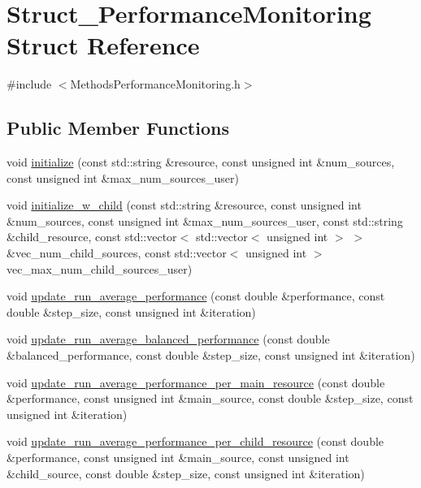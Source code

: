 \hypertarget{structStruct__PerformanceMonitoring}{\section{Struct\-\_\-\-Performance\-Monitoring Struct Reference}
\label{structStruct__PerformanceMonitoring}
}


{\ttfamily \#include $<$Methods\-Performance\-Monitoring.\-h$>$}

\subsection*{Public Member Functions}
\begin{DoxyCompactItemize}
\item 
void \hyperlink{structStruct__PerformanceMonitoring_a97d5962047f0577a68ddd420b1da8a1e}{initialize} (const std\-::string \&resource, const unsigned int \&num\-\_\-sources, const unsigned int \&max\-\_\-num\-\_\-sources\-\_\-user)
\item 
void \hyperlink{structStruct__PerformanceMonitoring_aa7963e7c54d30095a7283bbf49f4a61b}{initialize\-\_\-w\-\_\-child} (const std\-::string \&resource, const unsigned int \&num\-\_\-sources, const unsigned int \&max\-\_\-num\-\_\-sources\-\_\-user, const std\-::string \&child\-\_\-resource, const std\-::vector$<$ std\-::vector$<$ unsigned int $>$ $>$ \&vec\-\_\-num\-\_\-child\-\_\-sources, const std\-::vector$<$ unsigned int $>$ vec\-\_\-max\-\_\-num\-\_\-child\-\_\-sources\-\_\-user)
\item 
void \hyperlink{structStruct__PerformanceMonitoring_adcdd8d9911b6ef408cfe6680ab1fda43}{update\-\_\-run\-\_\-average\-\_\-performance} (const double \&performance, const double \&step\-\_\-size, const unsigned int \&iteration)
\item 
void \hyperlink{structStruct__PerformanceMonitoring_a73b2ca8763d02a85aa900c17c2187d18}{update\-\_\-run\-\_\-average\-\_\-balanced\-\_\-performance} (const double \&balanced\-\_\-performance, const double \&step\-\_\-size, const unsigned int \&iteration)
\item 
void \hyperlink{structStruct__PerformanceMonitoring_a19680cdaf279198b2065f97045aa7861}{update\-\_\-run\-\_\-average\-\_\-performance\-\_\-per\-\_\-main\-\_\-resource} (const double \&performance, const unsigned int \&main\-\_\-source, const double \&step\-\_\-size, const unsigned int \&iteration)
\item 
void \hyperlink{structStruct__PerformanceMonitoring_a797d2ddf9ac5543dbc8d1a1cc6a757ad}{update\-\_\-run\-\_\-average\-\_\-performance\-\_\-per\-\_\-child\-\_\-resource} (const double \&performance, const unsigned int \&main\-\_\-source, const unsigned int \&child\-\_\-source, const double \&step\-\_\-size, const unsigned int \&iteration)
\end{DoxyCompactItemize}
